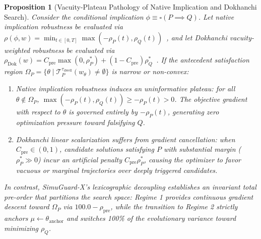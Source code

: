\documentclass[journal]{IEEEtran}
\newtheorem{proposition}{Proposition}
\begin{document}
\begin{proposition}[Vacuity-Plateau Pathology of Native Implication and Dokhanchi Search]
\label{prop:vacuity_pathology}
Consider the conditional implication $\phi \equiv \square(P \implies Q)$. Let native implication robustness be evaluated via $\rho(\phi, w) = \min_{t \in [0, T]} \max(-\rho_P(t), \rho_Q(t))$~\cite{fainekos2009robustness}, and let Dokhanchi vacuity-weighted robustness be evaluated via $\rho_{\mathrm{Dok}}(w) = C_{\mathrm{pre}} \max(0, \rho_P^*) + (1 - C_{\mathrm{pre}}) \rho_Q^*$~\cite{dokhanchi2018vacuity}.
If the antecedent satisfaction region $\Omega_P = \{\theta \mid \mathcal{T}_P^{\tau_{\text{dwell}}}(w_\theta) \neq \emptyset\}$ is narrow or non-convex:
\begin{enumerate}
    \item Native implication robustness induces an uninformative plateau: for all $\theta \notin \Omega_P$, $\max(-\rho_P(t), \rho_Q(t)) \ge -\rho_P(t) > 0$. The objective gradient with respect to $\theta$ is governed entirely by $-\rho_P(t)$, generating zero optimization pressure toward falsifying $Q$.
    \item Dokhanchi linear scalarization suffers from gradient cancellation: when $C_{\mathrm{pre}} \in (0, 1)$, candidate solutions satisfying $P$ with substantial margin ($\rho_P^* \gg 0$) incur an artificial penalty $C_{\mathrm{pre}} \rho_P^*$, causing the optimizer to favor vacuous or marginal trajectories over deeply triggered candidates.
\end{enumerate}
In contrast, SimuGuard-X's lexicographic decoupling establishes an invariant total pre-order that partitions the search space: Regime 1 provides continuous gradient descent toward $\Omega_P$ via $100.0 - \rho_{\mathrm{pre}}$, while the transition to Regime 2 strictly anchors $\mu \leftarrow \theta_{\mathrm{anchor}}$ and switches 100\% of the evolutionary variance toward minimizing $\rho_Q$.
\end{proposition}
\end{document}
